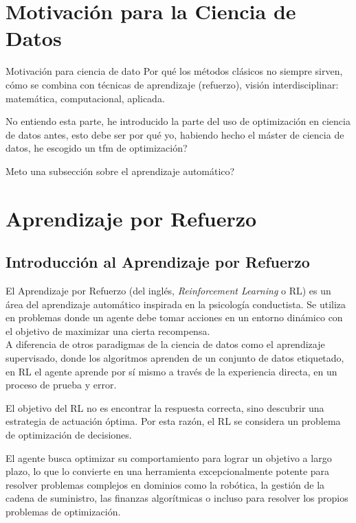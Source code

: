 \documentclass[12pt,a4paper]{book}
\begin{document}
\section{Motivación para la Ciencia de Datos}

\color{red}
Motivación para ciencia de dato Por qué los métodos clásicos no siempre sirven, cómo se combina con técnicas de aprendizaje (refuerzo), visión interdisciplinar: matemática, computacional, aplicada.

No entiendo esta parte, he introducido la parte del uso de optimización en ciencia de datos antes, esto debe ser por qué yo, habiendo hecho el máster de ciencia de datos, he escogido un tfm de optimización?

\color{black}

\color{red} Meto una subsección sobre el aprendizaje automático?\color{black}
\section{Aprendizaje por Refuerzo}

\hrulefill

\subsection{Introducción al Aprendizaje por Refuerzo}

El Aprendizaje por Refuerzo \cite{intro_reforzado} (del inglés, \textit{Reinforcement Learning} o RL) es un área del aprendizaje automático inspirada en la psicología conductista. Se utiliza en problemas donde un agente debe tomar acciones en un entorno dinámico con el objetivo de maximizar una cierta recompensa.\\
A diferencia de otros paradigmas de la ciencia de datos como el aprendizaje supervisado, donde los algoritmos aprenden de un conjunto de datos etiquetado, en RL el agente aprende por sí mismo a través de la experiencia directa, en un proceso de prueba y error. 

El objetivo del RL no es encontrar la respuesta correcta, sino descubrir una estrategia de actuación óptima. Por esta razón, el RL se considera un problema de optimización de decisiones.

El agente busca optimizar su comportamiento para lograr un objetivo a largo plazo, lo que lo convierte en una herramienta excepcionalmente potente para resolver problemas complejos en dominios como la robótica, la gestión de la cadena de suministro, las finanzas algorítmicas o incluso para resolver los propios problemas de optimización.
\end{document}
